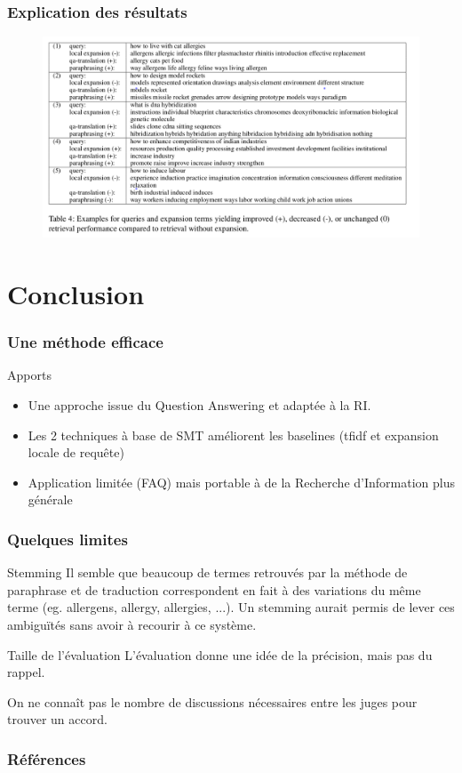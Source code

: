 \documentclass[10pt]{beamer}
\begin{document}
\begin{frame}
  \frametitle{Explication des résultats}

  \begin{figure}[h]
    \centering
    \includegraphics[width=\textwidth]{table4}
    \label{fig:res}
  \end{figure}
\end{frame}

\section{Conclusion}
\label{sec:conclusion}


\begin{frame}
  \frametitle{Une méthode efficace}
  \begin{block}{Apports}
  \begin{itemize}
    \item Une approche issue du Question Answering et adaptée à la RI.
    \item Les 2 techniques à base de SMT améliorent les baselines (tfidf et expansion locale de requ\^ete)
    \item Application limitée (FAQ) mais portable à de la Recherche d'Information plus générale
  \end{itemize}
  \end{block}
\end{frame}

\begin{frame}
  \frametitle{Quelques limites}

  \begin{block}{Stemming}
  Il semble que beaucoup de termes retrouvés par la méthode de
  paraphrase et de traduction correspondent en fait à des variations
  du même terme (eg. allergens, allergy, allergies, ...). Un stemming
  aurait permis de lever ces ambiguïtés sans avoir à recourir à ce système.
  \end{block}
  \begin{block}{Taille de l'évaluation}
    L'évaluation donne une idée de la précision, mais pas du rappel.
    
    On ne connaît pas le nombre de discussions nécessaires entre les
    juges pour trouver un accord.
  \end{block}
\end{frame}


\begin{frame}[allowframebreaks]
  \frametitle{Références}
  
  
\end{frame}
\end{document}
